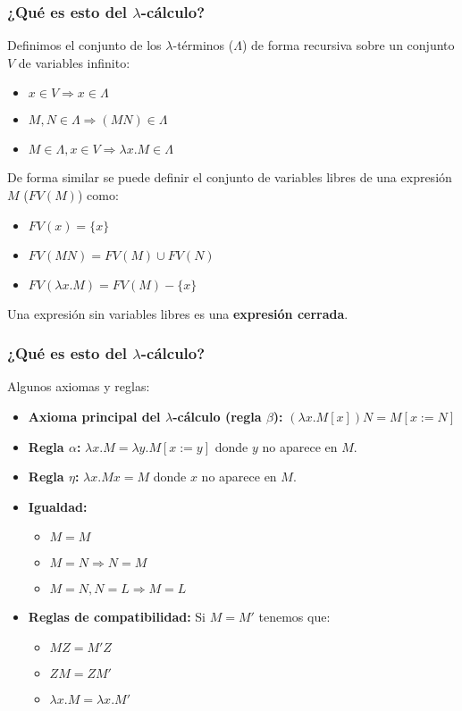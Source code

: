 \documentclass[spanish, a4paper, 12pt, final, slideColor, nototal, colorBG, pdf, noaccumulate, darkblue] {beamer}
\begin{document}
\begin{frame}
    \frametitle{¿Qué es esto del $\lambda$-cálculo?}
    Definimos el conjunto de los $\lambda$-términos ($\Lambda$) de forma recursiva sobre un conjunto $V$ de variables infinito:
    \begin{itemize}
        \item $x \in V \Rightarrow x \in \Lambda$
        \item $M, N \in \Lambda \Rightarrow (MN)\in \Lambda$
        \item $M \in \Lambda, x \in V \Rightarrow \lambda x.M \in \Lambda$
    \end{itemize}
    De forma similar se puede definir el conjunto de variables libres de una expresión $M$ ($FV(M)$) como:
    \begin{itemize}
        \item $FV(x) = \{x\}$
        \item $FV(MN) = FV(M) \cup FV(N)$
        \item $FV(\lambda x.M) = FV(M) - \{x\}$
    \end{itemize}%
    Una expresión sin variables libres es una \textbf{expresión cerrada}.
\end{frame}
\begin{frame}
    \frametitle{¿Qué es esto del $\lambda$-cálculo?}
    Algunos axiomas y reglas:
    \begin{itemize}
        \item \textbf{Axioma principal del $\lambda$-cálculo (regla $\beta$): }$(\lambda x.M[x])N = M[x := N]$
        \item \textbf{Regla $\alpha$: }$\lambda x.M = \lambda y.M[x := y]$ donde $y$ no aparece en $M$.
        \item \textbf{Regla $\eta$: }$\lambda x.Mx = M$ donde $x$ no aparece en $M$.
        \item \textbf{Igualdad: }
        \begin{itemize}
            \item $M = M$
            \item $M = N \Rightarrow N = M$
            \item $M = N, N = L \Rightarrow M = L$
        \end{itemize}
        \item \textbf{Reglas de compatibilidad: } Si $M = M'$ tenemos que:
        \begin{itemize}
            \item $MZ = M'Z$
            \item $ZM = ZM'$
            \item $\lambda x.M = \lambda x.M'$
        \end{itemize}
    \end{itemize}
\end{frame}
\end{document}
